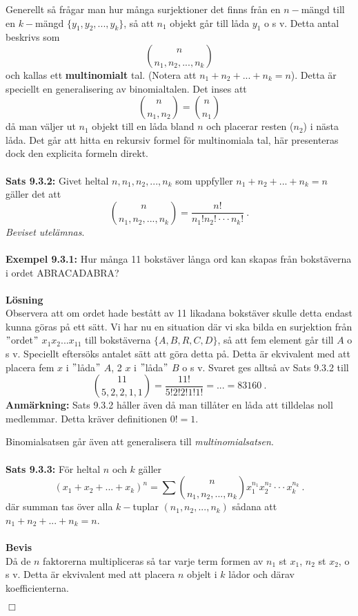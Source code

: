 \documentclass{article}
\begin{document}
Generellt så frågar man hur många surjektioner det finns från en $n-$mängd till en $k-$mängd $\{y_1,y_2,...,y_k\}$, så att $n_1$ objekt går till låda $y_1$ o s v. Detta antal beskrivs som
$$
{n \choose n_1,n_2,...,n_k} 
$$
och kallas ett \textbf{multinomialt} tal. (Notera att $n_1+n_2+...+n_k=n$). Detta är speciellt en generalisering av binomialtalen. Det inses att
$$
{n \choose n_1,n_2}={n \choose n_1}
$$
då man väljer ut $n_1$ objekt till en låda bland $n$ och placerar resten ($n_2$) i nästa låda. Det går att hitta en rekursiv formel för multinomiala tal, här presenteras dock den explicita formeln direkt.\\ \\
\textbf{Sats 9.3.2:} Givet heltal $n,n_1,n_2,...,n_k$ som uppfyller $n_1+n_2+...+n_k=n$ gäller det att
$$
{n \choose n_1,n_2,...,n_k}=\frac{n!}{n_1!n_2!\cdot\cdot\cdot n_k!} \ .
$$
\textit{Beviset utelämnas}.\\ \\
\textbf{Exempel 9.3.1:} Hur många 11 bokstäver långa ord kan skapas från bokstäverna i ordet ABRACADABRA?\\ \\
\textbf{Lösning}\\
Observera att om ordet hade bestått av 11 likadana bokstäver skulle detta endast kunna göras på ett sätt. Vi har nu en situation där vi ska bilda en surjektion från $"$ordet$"$ $x_1x_2...x_{11}$ till bokstäverna $\{A,B,R,C,D\}$, så att fem element går till $A$ o s v. Speciellt eftersöks antalet sätt att göra detta på. Detta är ekvivalent med att placera fem $x$ i $"$låda$"$ $A$, 2 $x$ i $"$låda$"$ $B$ o s v. Svaret ges alltså av Sats 9.3.2 till
$$
{11 \choose 5,2,2,1,1}=\frac{11!}{5!2!2!1!1!}=...=83160 \ .
$$
\textbf{Anmärkning:} Sats 9.3.2 håller även då man tillåter en låda att tilldelas noll medlemmar. Detta kräver definitionen $0!=1$.

Binomialsatsen går även att generalisera till \textit{multinomialsatsen}. \\ \\
\textbf{Sats 9.3.3:} För heltal $n$ och $k$ gäller
$$
(x_1+x_2+...+x_k)^n=\sum{n\choose n_1,n_2,...,n_k}x_1^{n_1}x_2^{n_2}\cdot\cdot\cdot x_k^{n_k} \ .
$$
där summan tas över alla $k-$tuplar $(n_1,n_2,...,n_k)$ sådana att $n_1+n_2+...+n_k=n$.\\ \\
\textbf{Bevis}\\
Då de $n$ faktorerna multipliceras så tar varje term formen av $n_1$ st $x_1$, $n_2$ st $x_2$, o s v. Detta är ekvivalent med att placera $n$ objelt i $k$ lådor och därav koefficienterna.
\begin{flushright}
$\Box$
\end{flushright}
\end{document}

